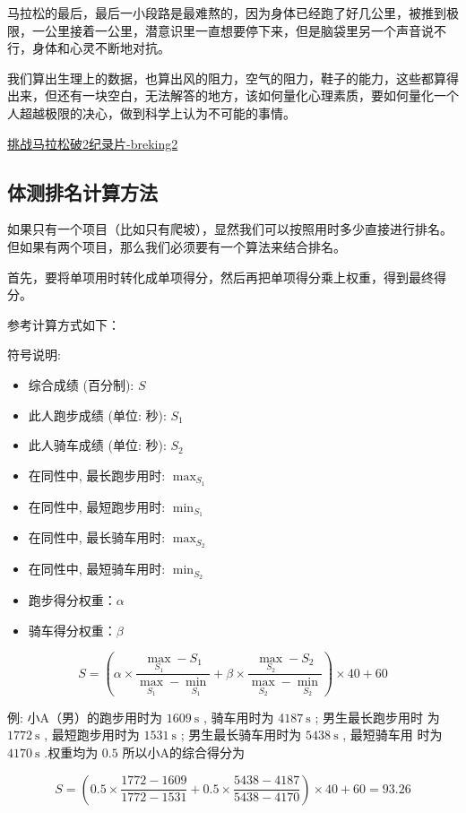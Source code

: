 \documentclass{ctexbook}
\begin{document}
马拉松的最后，最后一小段路是最难熬的，因为身体已经跑了好几公里，被推到极限，一公里接着一公里，潜意识里一直想要停下来，但是脑袋里另一个声音说不行，身体和心灵不断地对抗。

我们算出生理上的数据，也算出风的阻力，空气的阻力，鞋子的能力，这些都算得出来，但还有一块空白，无法解答的地方，该如何量化心理素质，要如何量化一个人超越极限的决心，做到科学上认为不可能的事情。

\href{https://www.bilibili.com/video/BV1pb411K74L}{挑战马拉松破2纪录片-breking2}
\subsection{体测排名计算方法}
如果只有一个项目（比如只有爬坡），显然我们可以按照用时多少直接进行排名。但如果有两个项目，那么我们必须要有一个算法来结合排名。

首先，要将单项用时转化成单项得分，然后再把单项得分乘上权重，得到最终得分。

参考计算方式如下：

符号说明:

\begin{itemize}
    \item 综合成绩 (百分制):  $S$ 
    \item 此人跑步成绩 (单位: 秒):  $S_{1}$ 
    \item 此人骑车成绩 (单位: 秒):  $S_{2}$ 
    \item 在同性中, 最长跑步用时:  $\max _{S_{1}}$ 
    \item 在同性中, 最短跑步用时:  $\min _{S_{1}}$ 
    \item 在同性中, 最长骑车用时:  $\max _{S_{2}}$ 
    \item 在同性中, 最短骑车用时:  $\min _{S_{2}}$ 
    \item 跑步得分权重：$\alpha$
    \item 骑车得分权重：$\beta$
\end{itemize}

\[S=\left(\alpha \times \frac{\max _{S_{1}}-S_{1}}{\max _{S_{1}}-\min _{S_{1}}}+\beta\times \frac{\max _{S_{2}}-S_{2}}{\max _{S_{2}}-\min _{S_{2}}}\right) \times 40+60\]

例: 小A（男）的跑步用时为  $1609 \mathrm{~s}$ , 骑车用时为  4$187 \mathrm{~s}$ ; 男生最长跑步用时 为  $1772 \mathrm{~s}$ , 最短跑步用时为  $1531 \mathrm{~s}$ ; 男生最长骑车用时为  $5438 \mathrm{~s}$ , 最短骑车用 时为  $4170 \mathrm{~s}$ .权重均为 $0.5$ 所以小A的综合得分为

\[S=\left(0.5 \times \frac{1772-1609}{1772-1531}+0.5 \times \frac{5438-4187}{5438-4170}\right) \times 40+60=93.26\]
\end{document}
